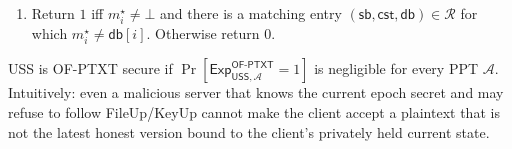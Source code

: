 \begin{definition}
\begin{enumerate}
  \item Return $1$ iff $m_i^\star\neq\bot$ and there is a matching entry $(\mathsf{sb},\mathsf{cst},\mathsf{db})\in\mathcal R$ for which $m_i^\star\neq\mathsf{db}[i]$. Otherwise return $0$.
\end{enumerate}
USS is OF-PTXT secure if $\Pr[\mathsf{Exp}^{\mathsf{OF\text{-}PTXT}}_{\mathsf{USS},\mathcal{A}}=1]$ is negligible for every PPT $\mathcal{A}$.
Intuitively: even a malicious server that knows the current epoch secret and may refuse to follow FileUp/KeyUp cannot make the client accept a plaintext that is not the latest honest version bound to the client's privately held current state.
\end{definition}

